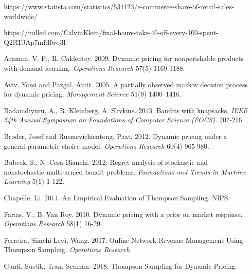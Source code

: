 \documentclass[a4paper]{article}
\begin{document}
\begin{thebibliography}{9}
	https://www.statista.com/statistics/534123/e-commerce-share-of-retail-sales-worldwide/
	
	https://milled.com/CalvinKlein/final-hours-take-40-off-every-100-spent-Q2RTJAp7mfdfwq3I
	
	Araman, V. F., R. Caldentey. 2009. Dynamic pricing for nonperishable products with demand learning.
	\emph{Operations Research} 57(5) 1169-1188.
	
	Aviv, Yossi and Pazgal, Amit. 2005. A partially observed markov decision process for dynamic
	pricing. \emph{Management Science} 51(9) 1400–1416.
	
	Badanidiyuru, A., R. Kleinberg, A. Slivkins. 2013. Bandits with knapsacks. \emph{IEEE 54th Annual Symposium on Foundations of Computer Science (FOCS).} 207-216.	
	
	Broder, Josef and Rusmevichientong, Paat. 2012. Dynamic pricing under a general parametric choice model. \emph{Operations Research} 60(4) 965-980.
	
	Bubeck, S., N. Cesa-Bianchi. 2012. Regret analysis of stochastic and nonstochastic multi-armed bandit problems. \emph{Foundations and Trends in Machine Learning} 5(1) 1-122.
	
	Chapelle,  Li. 2011. An Empirical Evaluation of Thompson Sampling. NIPS. 
	
	Farias, V., B. Van Roy. 2010. Dynamic pricing with a prior on market response. \emph{Operations Research} 58(1) 16-29.
	
	Ferreira, Simchi-Levi, Wang. 2017. Online Network Revenue Management Using Thompson Sampling. \emph{Operations Research}
	
	Ganti, Sustik, Tran, Seaman. 2018. Thompson Sampling for Dynamic Pricing. 
\end{thebibliography}
\end{document}

